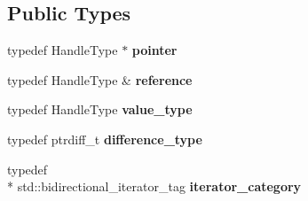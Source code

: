 \subsection*{Public Types}
\begin{DoxyCompactItemize}
\item 
\hypertarget{classINMOST_1_1Mesh_1_1base__iterator_a29cc18b3b80bca355984dc791f040f03}{typedef Handle\-Type $\ast$ {\bfseries pointer}}\label{classINMOST_1_1Mesh_1_1base__iterator_a29cc18b3b80bca355984dc791f040f03}

\item 
\hypertarget{classINMOST_1_1Mesh_1_1base__iterator_a67b7c0dba5f2926f55739d1e441347d8}{typedef Handle\-Type \& {\bfseries reference}}\label{classINMOST_1_1Mesh_1_1base__iterator_a67b7c0dba5f2926f55739d1e441347d8}

\item 
\hypertarget{classINMOST_1_1Mesh_1_1base__iterator_a6d47ff7ab477cc9c873c232236a860f0}{typedef Handle\-Type {\bfseries value\-\_\-type}}\label{classINMOST_1_1Mesh_1_1base__iterator_a6d47ff7ab477cc9c873c232236a860f0}

\item 
\hypertarget{classINMOST_1_1Mesh_1_1base__iterator_a83167a54e5fc607c5ce567420cef9614}{typedef ptrdiff\-\_\-t {\bfseries difference\-\_\-type}}\label{classINMOST_1_1Mesh_1_1base__iterator_a83167a54e5fc607c5ce567420cef9614}

\item 
\hypertarget{classINMOST_1_1Mesh_1_1base__iterator_af093745c78c6779d0c159a4671c1bd6b}{typedef \\*
std\-::bidirectional\-\_\-iterator\-\_\-tag {\bfseries iterator\-\_\-category}}\label{classINMOST_1_1Mesh_1_1base__iterator_af093745c78c6779d0c159a4671c1bd6b}

\end{DoxyCompactItemize}
